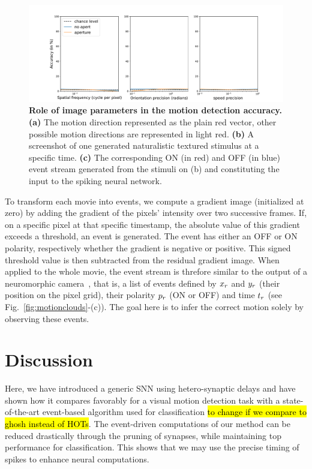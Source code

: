 \documentclass[default]{sn-jnl}%
\theoremstyle{thmstyleone}%
\theoremstyle{thmstyletwo}%
\theoremstyle{thmstylethree}%
\newcommand{\seeFig}[1]{see Fig.~\ref{fig:#1}}%
\newcommand{\note}[1]{{\sethlcolor{yellow}\hl{#1}}}
\begin{document}
\begin{figure}[h!]
    \centering
    \includegraphics[width=0.95\linewidth]{figures/motion_clouds.pdf}
    \caption{{\bf Role of image parameters in the motion detection accuracy.} {\bf (a)} The motion direction represented as the plain red vector, other possible motion directions are represented in light red. {\bf (b)} A screenshot of one generated naturalistic textured stimulus at a specific time. %
    {\bf (c)} The corresponding ON (in red) and OFF (in blue) event stream generated from the stimuli on (b) and constituting the input to the spiking neural network.}
    \label{fig:motion_clouds}
\end{figure}

To transform each movie into events, we compute a gradient image (initialized at zero) by adding the gradient of the pixels' intensity over two successive frames. If, on a specific pixel at that specific timestamp, the absolute value of this gradient exceeds a threshold, an event is generated. The event has either an OFF or ON polarity, respectively whether the gradient is negative or positive. This signed threshold value is then subtracted from the residual gradient image. When applied to the whole movie, the event stream is threfore similar to the output of a neuromorphic camera~\citep{rasetto_challenges_2022}, that is, a list of events defined by $x_r$ and $y_r$ (their position on the pixel grid), their polarity $p_r$ (ON or OFF) and time $t_r$  (\seeFig{motionclouds}-(c)). The goal here is to infer the correct motion solely by observing these events.
%
\section{Discussion}
Here, we have introduced a generic SNN using hetero-synaptic delays and have shown how it compares favorably for a visual motion detection task with a state-of-the-art event-based algorithm used for classification \note{to change if we compare to ghosh instead of HOTs}. The event-driven computations of our method can be reduced drastically through the pruning of synapses, while maintaining top performance for classification. This shows that we may use the precise timing of spikes to enhance neural computations. 
%
\end{document}
